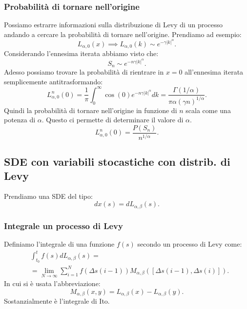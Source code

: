 \subsubsection{Probabilità di tornare nell'origine}%
\label{subsub:Probabilità di tornare nell'origine}
Possiamo estrarre informazioni sulla distribuzione di Levy di un processo andando a cercare la probabilità di tornare nell'origine. Prendiamo ad esempio:
\[
    L_{\alpha,0}(x) \implies  L_{\alpha,0}(k) \sim e^{-\gamma\left|k\right|^\alpha}
.\] 
Considerando l'ennesima iterata abbiamo visto che:
\[
    S_n \sim e^{-n\gamma\left|k\right|^\alpha}
.\] 
Adesso possiamo trovare la probabilità di rientrare in $x=0$  all'ennesima iterata semplicemente antitrasformando:
\[
    L^n_{\alpha,0}(0) = \frac{1}{\pi}\int_0^{\infty}\cos (0) e^{-n\gamma\left|k\right|^\alpha}dk = 
    \frac{\Gamma (1 / \alpha) }{\pi\alpha\left(\gamma n\right)^{1 / \alpha}}
.\] 
Quindi la probabilità di tornare nell'origine in funzione di $n$  scala come una potenza di $\alpha$. Questo ci permette di determinare il valore di $\alpha$.
\[
    L^n_{\alpha,0}(0) = \frac{P(S_n)}{n^{1 / \alpha}} 
.\] 
\subsection{SDE con variabili stocastiche con distrib. di Levy}%
\label{sub:SDE con variabili stocastiche con distrib. di Levy}
Prendiamo una SDE del tipo:
\[
    dx(s)  = dL_{\alpha,\beta  }(s) 
.\] 
\subsubsection{Integrale un processo di Levy}%
\label{subsub:Integrale un processo di Levy}
Definiamo l'integrale di una funzione $f(s)$ secondo un processo di Levy come:
\[\begin{aligned}
    &\int_{t_0}^{t} f(s) dL_{\alpha,\beta  }(s) = \\
    &=\lim_{N \to \infty} \sum_{i=1}^{N} f(\Delta s(i-1) ) M_{\alpha,\beta  }\left(\left[\Delta s(i-1), \Delta s(i)\right]\right)
.\end{aligned}\]
In cui si è usata l'abbreviazione:
\[
M_{\alpha,\beta}(x,y) = L_{\alpha,\beta}(x)-L_{\alpha,\beta}(y)
.\] 
Sostanzialmente è l'integrale di Ito.

